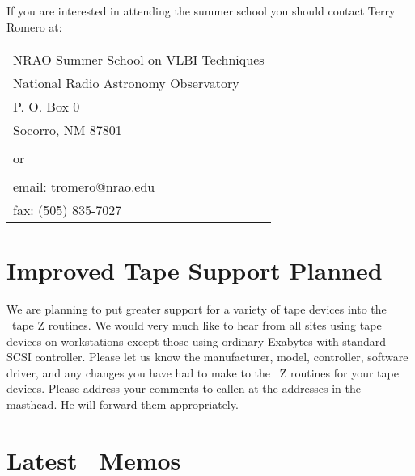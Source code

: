 If you are interested in attending the summer school you should contact
Terry Romero at:
\vspace{\MYSpace}
\begin{center}
\begin{tabular}{l}
   NRAO Summer School on VLBI Techniques \\
   National Radio Astronomy Observatory \\
   P. O. Box 0  \\
   Socorro, NM 87801 \\
   \\
   or \\
   \\
   email: tromero@nrao.edu \\
   fax: (505) 835-7027 \\
\end{tabular}
\end{center}

\clearpage

\section{Improved Tape Support Planned}

We are planning to put greater support for a variety of tape devices
into the \AIPS\ tape Z routines.  We would very much like to hear from
all sites using tape devices on workstations except those using
ordinary Exabytes with standard SCSI controller.  Please let us
know the manufacturer, model, controller, software driver, and any
changes you have had to make to the \AIPS\ Z routines for your tape
devices.  Please address your comments to eallen at the addresses in
the masthead.  He will forward them appropriately.

\section{Latest \AIPS\ Memos}

